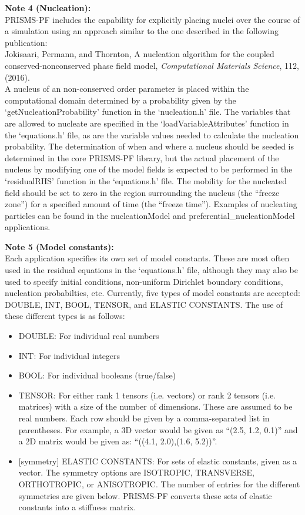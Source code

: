 \documentclass[10pt]{article} %
\begin{document}
\textbf{Note 4 (Nucleation):} \\
PRISMS-PF includes the capability for explicitly placing nuclei over the course of a simulation using an approach similar to the one described in the following publication: \\
Jokisaari, Permann, and Thornton, A nucleation algorithm for the coupled conserved-nonconserved phase field model, \emph{Computational Materials Science}, 112, (2016). \\
A nucleus of an non-conserved order parameter is placed within the computational domain determined by a probability given by the `getNucleationProbability' function in the `nucleation.h' file. The variables that are allowed to nucleate are specified in the `loadVariableAttributes' function in the `equations.h' file, as are the variable values needed to calculate the nucleation probability. The determination of when and where a nucleus should be seeded is determined in the core PRISMS-PF library, but the actual placement of the nucleus by modifying one of the model fields is expected to be performed in the `residualRHS' function in the `equations.h' file. The mobility for the nucleated field should be set to zero in the region surrounding the nucleus (the ``freeze zone'') for a specified amount of time (the ``freeze time''). Examples of nucleating particles can be found in the nucleationModel and preferential\_nucleationModel applications.

\textbf{Note 5 (Model constants):} \\
Each application specifies its own set of model constants. These are most often used in the residual equations in the `equations.h' file, although they may also be used to specify initial conditions, non-uniform Dirichlet boundary conditions, nucleation probabilties, etc. Currently, five types of model constants are accepted: DOUBLE, INT, BOOL, TENSOR, and ELASTIC CONSTANTS. The use of these different types is as follows:
\begin{itemize}
\item DOUBLE: For individual real numbers
\item INT: For individual integers
\item BOOL: For individual booleans (true/false)
\item TENSOR: For either rank 1 tensors (i.e. vectors) or rank 2 tensors (i.e. matrices) with a size of the number of dimensions. These are assumed to be real numbers. Each row should be given by a comma-separated list in parentheses. For example, a 3D vector would be given as ``(2.5, 1.2, 0.1)'' and a 2D matrix would be given as: ``((4.1, 2.0),(1.6, 5.2))''.
\item {[symmetry]} ELASTIC CONSTANTS: For sets of elastic constants, given as a vector. The symmetry options are ISOTROPIC, TRANSVERSE, ORTHOTROPIC, or ANISOTROPIC. The number of entries for the different symmetries are given below. PRISMS-PF converts these sets of elastic constants into a stiffness matrix.
\end{itemize}
\end{document}
